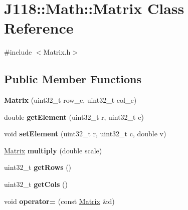 \hypertarget{class_j118_1_1_math_1_1_matrix}{}\section{J118\+:\+:Math\+:\+:Matrix Class Reference}
\label{class_j118_1_1_math_1_1_matrix}


{\ttfamily \#include $<$Matrix.\+h$>$}

\subsection*{Public Member Functions}
\begin{DoxyCompactItemize}
\item 
\hypertarget{class_j118_1_1_math_1_1_matrix_a06a8b3957814b022c059cb831302d32e}{}{\bfseries Matrix} (uint32\+\_\+t row\+\_\+c, uint32\+\_\+t col\+\_\+c)\label{class_j118_1_1_math_1_1_matrix_a06a8b3957814b022c059cb831302d32e}

\item 
\hypertarget{class_j118_1_1_math_1_1_matrix_abd59c435bd909b083a5d8265728e3ced}{}double {\bfseries get\+Element} (uint32\+\_\+t r, uint32\+\_\+t c)\label{class_j118_1_1_math_1_1_matrix_abd59c435bd909b083a5d8265728e3ced}

\item 
\hypertarget{class_j118_1_1_math_1_1_matrix_a53191f55245978c271752e8c28df3bad}{}void {\bfseries set\+Element} (uint32\+\_\+t r, uint32\+\_\+t c, double v)\label{class_j118_1_1_math_1_1_matrix_a53191f55245978c271752e8c28df3bad}

\item 
\hypertarget{class_j118_1_1_math_1_1_matrix_ae9369732e37ead04297d86654e9596d7}{}\hyperlink{class_j118_1_1_math_1_1_matrix}{Matrix} {\bfseries multiply} (double scale)\label{class_j118_1_1_math_1_1_matrix_ae9369732e37ead04297d86654e9596d7}

\item 
\hypertarget{class_j118_1_1_math_1_1_matrix_a7c927512cb446d6bdd7d0449b1e60a0c}{}uint32\+\_\+t {\bfseries get\+Rows} ()\label{class_j118_1_1_math_1_1_matrix_a7c927512cb446d6bdd7d0449b1e60a0c}

\item 
\hypertarget{class_j118_1_1_math_1_1_matrix_a0efbcdb8ca210d7de40a88e679d17d2a}{}uint32\+\_\+t {\bfseries get\+Cols} ()\label{class_j118_1_1_math_1_1_matrix_a0efbcdb8ca210d7de40a88e679d17d2a}

\item 
\hypertarget{class_j118_1_1_math_1_1_matrix_a520641ead28b80a5f38307d389f20c7d}{}void {\bfseries operator=} (const \hyperlink{class_j118_1_1_math_1_1_matrix}{Matrix} \&d)\label{class_j118_1_1_math_1_1_matrix_a520641ead28b80a5f38307d389f20c7d}

\end{DoxyCompactItemize}
